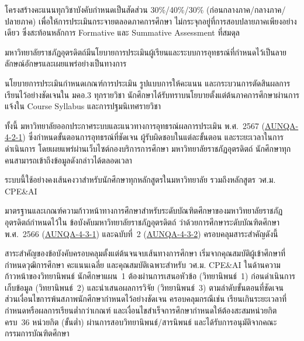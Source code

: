 โครงสร้างคะแนนทุกวิชาบังคับกำหนดเป็นสัดส่วน 30\%/40\%/30\% (ก่อนกลางภาค/กลางภาค/ปลายภาค) เพื่อให้การประเมินกระจายตลอดภาคการศึกษา ไม่กระจุกอยู่ที่การสอบปลายภาคเพียงอย่างเดียว ซึ่งสะท้อนหลักการ Formative และ Summative Assessment ที่สมดุล


มหาวิทยาลัยราชภัฏอุตรดิตถ์มีนโยบายการประเมินผู้เรียนและระบบการอุทธรณ์ที่กำหนดไว้เป็นลายลักษณ์อักษรและเผยแพร่อย่างเป็นทางการ

นโยบายการประเมินกำหนดเกณฑ์การประเมิน รูปแบบการให้คะแนน และกระบวนการตัดสินผลการเรียนไว้อย่างชัดเจนใน มคอ.3 ทุกรายวิชา นักศึกษาได้รับทราบนโยบายตั้งแต่ต้นภาคการศึกษาผ่านการแจ้งใน Course Syllabus และการปฐมนิเทศรายวิชา

ทั้งนี้ มหาวิทยาลัยออกประกาศระบบและแนวทางการอุทธรณ์ผลการประเมิน พ.ศ.~2567 (\hyperlink{ref:AUNQA-4-2-1}{AUNQA-4-2-1}) ซึ่งกำหนดขั้นตอนการอุทธรณ์ที่ชัดเจน ผู้รับผิดชอบในแต่ละขั้นตอน และระยะเวลาในการดำเนินการ โดยเผยแพร่ผ่านเว็บไซต์กองบริการการศึกษา มหาวิทยาลัยราชภัฏอุตรดิตถ์ นักศึกษาทุกคนสามารถเข้าถึงข้อมูลดังกล่าวได้ตลอดเวลา

ระบบนี้ใช้อย่างคงเส้นคงวาสำหรับนักศึกษาทุกหลักสูตรในมหาวิทยาลัย รวมถึงหลักสูตร วศ.ม. CPE\&AI


มาตรฐานและเกณฑ์ความก้าวหน้าทางการศึกษาสำหรับระดับบัณฑิตศึกษาของมหาวิทยาลัยราชภัฏอุตรดิตถ์กำหนดไว้ใน ข้อบังคับมหาวิทยาลัยราชภัฏอุตรดิตถ์ ว่าด้วยการศึกษาระดับบัณฑิตศึกษา พ.ศ.~2566 (\hyperlink{ref:AUNQA-4-3-1}{AUNQA-4-3-1}) และฉบับที่~2 (\hyperlink{ref:AUNQA-4-3-2}{AUNQA-4-3-2}) ครอบคลุมสาระสำคัญดังนี้

สาระสำคัญของข้อบังคับครอบคลุมตั้งแต่ต้นจนจบเส้นทางการศึกษา เริ่มจากคุณสมบัติผู้เข้าศึกษาที่กำหนดวุฒิการศึกษา คะแนนเฉลี่ย และคุณสมบัติเฉพาะสำหรับ วศ.ม. CPE\&AI ในด้านความก้าวหน้าของวิทยานิพนธ์ นักศึกษาแผน~1 ต้องผ่านการเสนอหัวข้อ (วิทยานิพนธ์~1) ก่อนดำเนินการเก็บข้อมูล (วิทยานิพนธ์~2) และนำเสนอผลการวิจัย (วิทยานิพนธ์~3) ตามลำดับขั้นตอนที่ชัดเจน ส่วนเงื่อนไขการพ้นสภาพนักศึกษากำหนดไว้อย่างชัดเจน ครอบคลุมกรณีเช่น เรียนเกินระยะเวลาที่กำหนดหรือผลการเรียนต่ำกว่าเกณฑ์ และเงื่อนไขสำเร็จการศึกษากำหนดให้ต้องสะสมหน่วยกิตครบ~36 หน่วยกิต (ขั้นต่ำ) ผ่านการสอบวิทยานิพนธ์/สารนิพนธ์ และได้รับการอนุมัติจากคณะกรรมการบัณฑิตศึกษา


